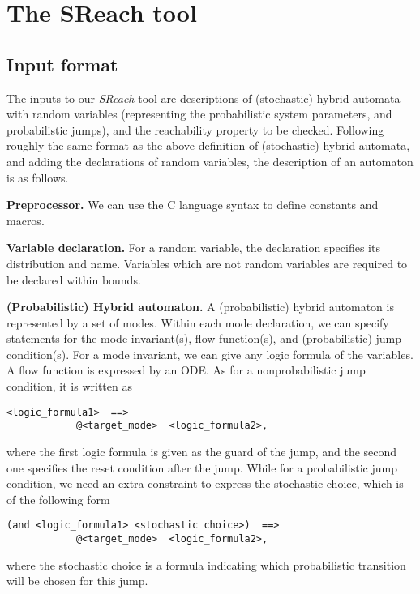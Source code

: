 \section{The SReach tool}\label{apndx:usage}
\subsection{Input format}
The inputs to our {\it SReach} tool are descriptions of (stochastic) hybrid automata with random variables (representing the probabilistic system parameters, and probabilistic jumps), and the reachability property to be checked. Following roughly the same format as the above definition of (stochastic) hybrid automata, and adding the declarations of random variables, the description of an automaton is as follows.

{\bf Preprocessor.} We can use the C language syntax to define constants and macros. 

{\bf Variable declaration.} For a random variable, the declaration specifies its distribution and name. Variables which are not random variables are required to be declared within bounds. 

{\bf (Probabilistic) Hybrid automaton.} A (probabilistic) hybrid automaton is represented by a set of modes. Within each mode declaration, we can specify statements for the mode invariant(s), flow function(s), and (probabilistic) jump condition(s). For a mode invariant, we can give any logic formula of the variables. A flow function is expressed by an ODE.  As for a nonprobabilistic jump condition, it is written as 
\vspace{-0.4cm}
\begin{verbatim} 
<logic_formula1>  ==> 
            @<target_mode>  <logic_formula2>,
\end{verbatim}
\vspace{-0.4cm}
where the first logic formula is given as the guard of the jump, and the second one specifies the reset condition after the jump. While for a probabilistic jump condition, we need an extra constraint to express the stochastic choice, which is of the following form
\vspace{-0.4cm}
\begin{verbatim}
(and <logic_formula1> <stochastic choice>)  ==> 
            @<target_mode>  <logic_formula2>,
\end{verbatim}
\vspace{-0.4cm}
where the stochastic choice is a formula indicating which probabilistic transition will be chosen for this jump.

